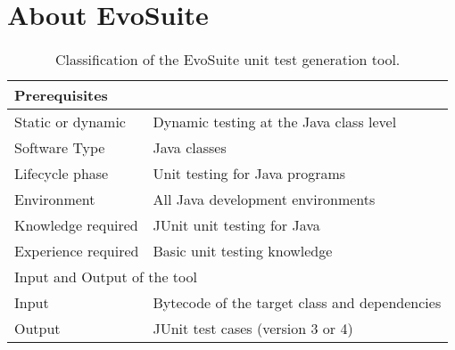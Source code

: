 \documentclass[10pt,conference,compsocconf]{IEEEtran}
\newcommand{\EVOSUITE}{{\sc EvoSuite}\xspace}
\begin{document}
\section{About \EVOSUITE}


\begin{table}[!h]
\renewcommand{\arraystretch}{1.3}
\caption{Classification of the \EVOSUITE unit test generation tool.}\label{tool-description}
\begin{tabular}{|l|p{5cm}|}
  \hline
  \multicolumn{2}{|l|}{Prerequisites} \\
  \hline
  Static or dynamic &  Dynamic testing at the Java class level\\
  Software Type &  Java classes\\
  Lifecycle phase&  Unit testing for Java programs\\
  Environment&  All Java development environments \\
  Knowledge required & JUnit unit testing for Java\\
  Experience required &  Basic unit testing knowledge\\
 \hline
  \multicolumn{2}{|l|}{Input and Output of the tool} \\
  \hline
 Input & Bytecode of the target class and dependencies \\
\hline
Output&  JUnit test cases (version 3 or 4)\\
 

\end{tabular}
\end{table}
\end{document}
